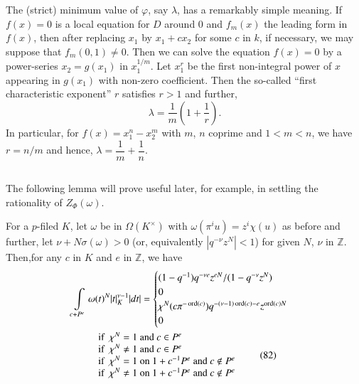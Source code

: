 The (strict) minimum value of $\varphi$, say $\lambda$, has a
remarkably simple meaning. If $f(x)=0$ is a local equation for $D$
around $0$ and $f_{m}(x)$ the leading form in $f(x)$, then after
replacing $x_{1}$ by $x_{1}+cx_{2}$ for some $c$ in $k$, if necessary,
we may suppose that $f_{m}(0,1)\neq 0$. Then we can solve the equation
$f(x)=0$ by a power-series $x_{2}=g(x_{1})$ in $x^{1/m}_{1}$. Let
$x^{r}_{1}$ be the first non-integral power of $x$ appearing in
$g(x_{1})$ with non-zero coefficient. Then the so-called ``first
characteristic exponent'' $r$ satisfies $r>1$ and further,
$$
\lambda=\frac{1}{m}\left(1+\frac{1}{r}\right).
$$
In particular, for $f(x)=x^{n}_{1}-x^{m}_{2}$ with $m$, $n$ coprime
and $1<m<n$, we have $r=n/m$ and hence,
$\lambda=\dfrac{1}{m}+\dfrac{1}{n}$.

\subsection{}\label{chap3:sec2:subsec4} %

The following lemma will prove useful later, for example, in settling
the rationality of $Z_{\Phi}(\omega)$.

\setcounter{lemma}{3}
\begin{lemma}\label{chap3:sec2:subsec4:lem4} %
  For a $p$-filed $K$, let $\omega$ be in $\Omega(K^{\times})$ with
  $\omega(\pi^{i}u)=z^{i}\chi(u)$ as before and further, let
  $\nu+N\sigma(\omega)>0$ (or, equivalently $|q^{-\nu}z^{N}|<1$) for
  given $N$, $\nu$ in $\mathbb{Z}$. Then,\pageoriginale for any $c$ in
  $K$ and $e$ in $\mathbb{Z}$, we have 
   {\rm 
    \begin{multline*}
    \int\limits_{c+P^{e}}\omega(t)^{N}|t|^{\nu-1}_{K}|dt|=
     \begin{cases}
      (1-q^{-1})q^{-\nu e}z^{eN}/(1-q^{-\nu}z^{N})\\ 
      0\\ 
      \chi^{N}(c\pi^{-\operatorname{ord}(c)})q^{-(\nu-1)\operatorname{ord}(c)-e}z^{\operatorname{ord}(c)N} \\
      0  
    \end{cases}\\
      \begin{array}{l}
        \text{if }~ \chi^{N}  =1 \text{ and } c\in P^{e}\\
        \text{if }~ \chi^{N}  \neq 1\text{ and } c\in P^{e}\\
        \text{if }~ \chi^{N}  =1\text{ on } 1+c^{-1}P^{e}\text{ and }
        c\not\in P^{e}\\ 
        \text{if }~ \chi^{N}  \neq 1 \text{ on } 1+c^{-1}P^{e}\text{ and }
      c\not\in P^{e}
      \end{array} \tag{82}\label{chap3:sec2:subsec4:eq82}
  \end{multline*}}
\end{lemma}

